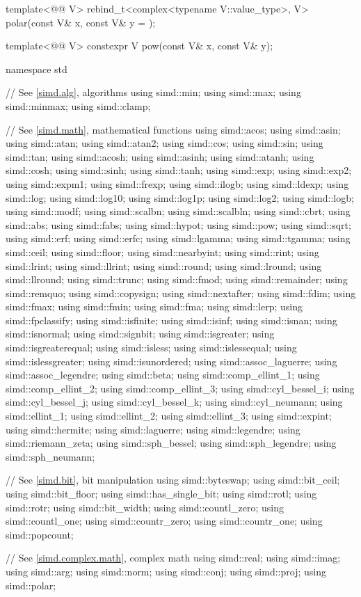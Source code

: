 \begin{codeblock}
{  template<@@ V>
    rebind_t<complex<typename V::value_type>, V> polar(const V& x, const V& y = {});

  template<@@ V> constexpr V pow(const V& x, const V& y);
}

namespace std {
  // See \ref{simd.alg}, algorithms
  using simd::min;
  using simd::max;
  using simd::minmax;
  using simd::clamp;

  // See \ref{simd.math}, mathematical functions
  using simd::acos;
  using simd::asin;
  using simd::atan;
  using simd::atan2;
  using simd::cos;
  using simd::sin;
  using simd::tan;
  using simd::acosh;
  using simd::asinh;
  using simd::atanh;
  using simd::cosh;
  using simd::sinh;
  using simd::tanh;
  using simd::exp;
  using simd::exp2;
  using simd::expm1;
  using simd::frexp;
  using simd::ilogb;
  using simd::ldexp;
  using simd::log;
  using simd::log10;
  using simd::log1p;
  using simd::log2;
  using simd::logb;
  using simd::modf;
  using simd::scalbn;
  using simd::scalbln;
  using simd::cbrt;
  using simd::abs;
  using simd::fabs;
  using simd::hypot;
  using simd::pow;
  using simd::sqrt;
  using simd::erf;
  using simd::erfc;
  using simd::lgamma;
  using simd::tgamma;
  using simd::ceil;
  using simd::floor;
  using simd::nearbyint;
  using simd::rint;
  using simd::lrint;
  using simd::llrint;
  using simd::round;
  using simd::lround;
  using simd::llround;
  using simd::trunc;
  using simd::fmod;
  using simd::remainder;
  using simd::remquo;
  using simd::copysign;
  using simd::nextafter;
  using simd::fdim;
  using simd::fmax;
  using simd::fmin;
  using simd::fma;
  using simd::lerp;
  using simd::fpclassify;
  using simd::isfinite;
  using simd::isinf;
  using simd::isnan;
  using simd::isnormal;
  using simd::signbit;
  using simd::isgreater;
  using simd::isgreaterequal;
  using simd::isless;
  using simd::islessequal;
  using simd::islessgreater;
  using simd::isunordered;
  using simd::assoc_laguerre;
  using simd::assoc_legendre;
  using simd::beta;
  using simd::comp_ellint_1;
  using simd::comp_ellint_2;
  using simd::comp_ellint_3;
  using simd::cyl_bessel_i;
  using simd::cyl_bessel_j;
  using simd::cyl_bessel_k;
  using simd::cyl_neumann;
  using simd::ellint_1;
  using simd::ellint_2;
  using simd::ellint_3;
  using simd::expint;
  using simd::hermite;
  using simd::laguerre;
  using simd::legendre;
  using simd::riemann_zeta;
  using simd::sph_bessel;
  using simd::sph_legendre;
  using simd::sph_neumann;

  // See \ref{simd.bit}, bit manipulation
  using simd::byteswap;
  using simd::bit_ceil;
  using simd::bit_floor;
  using simd::has_single_bit;
  using simd::rotl;
  using simd::rotr;
  using simd::bit_width;
  using simd::countl_zero;
  using simd::countl_one;
  using simd::countr_zero;
  using simd::countr_one;
  using simd::popcount;

  // See \ref{simd.complex.math},  complex math
  using simd::real;
  using simd::imag;
  using simd::arg;
  using simd::norm;
  using simd::conj;
  using simd::proj;
  using simd::polar;
}
\end{codeblock}


